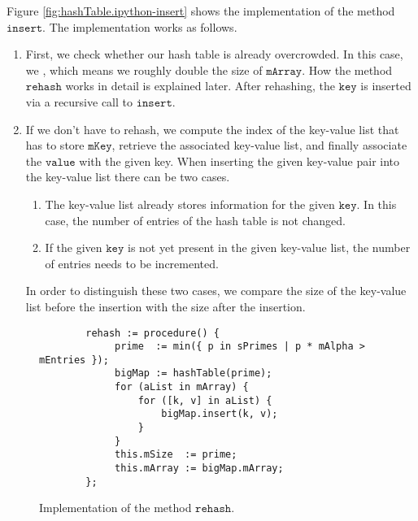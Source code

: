 Figure \ref{fig:hashTable.ipython-insert} shows the implementation of the method $\texttt{insert}$.
The implementation works as follows.
\begin{enumerate}
\item First, we check whether our hash table is already overcrowded.
      In this case, we , which means we roughly double the size of $\texttt{mArray}$.
      How the method $\texttt{rehash}$ works in detail is explained later.
      After rehashing, the $\texttt{key}$ is inserted via a recursive call to $\texttt{insert}$.
\item If we don't have to rehash, we compute the index of the key-value list that has to store
      $\texttt{mKey}$, retrieve the associated key-value list, and finally associate the
      $\texttt{value}$ with the given key.  When inserting the given key-value
      pair into the key-value list there can be two cases.
      \begin{enumerate}
      \item The key-value list already stores information for the given $\texttt{key}$.
            In this case, the number of entries of the hash table is not changed.
      \item If the given $\texttt{key}$ is not yet present in the given key-value list,
            the number of entries needs to be incremented.
      \end{enumerate}
      In order to distinguish these two cases, we compare the size of the key-value list before
      the insertion with the size after the insertion.     
\end{enumerate}


\begin{figure}[!ht]
\centering
\begin{verbatim}
        rehash := procedure() {
             prime  := min({ p in sPrimes | p * mAlpha > mEntries });
             bigMap := hashTable(prime);
             for (aList in mArray) {
                 for ([k, v] in aList) {
                     bigMap.insert(k, v);
                 }    
             }
             this.mSize  := prime;
             this.mArray := bigMap.mArray;
        };
\end{verbatim}
\vspace*{-0.3cm}
\caption{Implementation of the method $\texttt{rehash}$.}
\label{fig:hashTable.ipython-rehash}
\end{figure}


